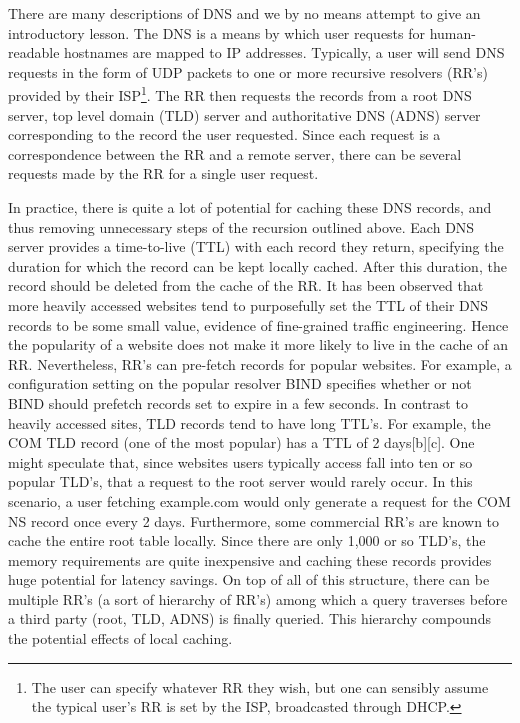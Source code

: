 \documentclass[sigconf,nonacm,10pt]{acmart}
\begin{document}
There are many descriptions of DNS and we by no means attempt to give an
introductory lesson. The DNS is a means by which user requests for
human-readable hostnames are mapped to IP addresses. Typically, a user
will send DNS requests in the form of UDP packets to one or more
recursive resolvers (RR's) provided by their
ISP\footnote{ The user can specify whatever RR they wish, but one can sensibly assume the typical user's RR is set by the ISP, broadcasted through DHCP. }.
The RR then requests the records from a root DNS server, top level
domain (TLD) server and authoritative DNS (ADNS) server corresponding to
the record the user requested. Since each request is a correspondence
between the RR and a remote server, there can be several requests made
by the RR for a single user request.

In practice, there is quite a lot of potential for caching these DNS
records, and thus removing unnecessary steps of the recursion outlined
above. Each DNS server provides a time-to-live (TTL) with each record
they return, specifying the duration for which the record can be kept
locally cached. After this duration, the record should be deleted from
the cache of the RR. It has been observed that more heavily accessed
websites tend to purposefully set the TTL of their DNS records to be
some small value, evidence of fine-grained traffic engineering. Hence
the popularity of a website does not make it more likely to live in the
cache of an RR. Nevertheless, RR's can pre-fetch records for popular
websites. For example, a configuration setting on the popular resolver
BIND specifies whether or not BIND should prefetch records set to expire
in a few seconds. In contrast to heavily accessed sites, TLD records
tend to have long TTL's. For example, the COM TLD record (one of the
most popular) has a TTL of 2 days{[}b{]}{[}c{]}. One might speculate
that, since websites users typically access fall into ten or so popular
TLD's, that a request to the root server would rarely occur. In this
scenario, a user fetching example.com would only generate a request for
the COM NS record once every 2 days. Furthermore, some commercial RR's
are known to cache the entire root table locally. Since there are only
1,000 or so TLD's, the memory requirements are quite inexpensive and
caching these records provides huge potential for latency savings. On
top of all of this structure, there can be multiple RR's (a sort of
hierarchy of RR's) among which a query traverses before a third party
(root, TLD, ADNS) is finally queried. This hierarchy compounds the
potential effects of local caching.
\end{document}
